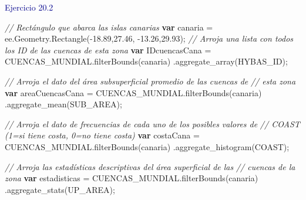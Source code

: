 \documentclass[
  12pt,
  letterpaper,
  twoside]{book}
\newenvironment{Shaded}{\begin{snugshade}}{\end{snugshade}}
\newcommand{\AttributeTok}[1]{\textcolor[rgb]{0.48,0.12,0.64}{#1}}
\newcommand{\CommentTok}[1]{\textcolor[rgb]{0.24,0.58,0.00}{\textit{#1}}}
\newcommand{\ControlFlowTok}[1]{\textcolor[rgb]{0.00,0.00,0.00}{\textbf{#1}}}
\newcommand{\FloatTok}[1]{\textcolor[rgb]{0.28,0.53,0.93}{#1}}
\newcommand{\FunctionTok}[1]{\textcolor[rgb]{0.48,0.12,0.64}{#1}}
\newcommand{\KeywordTok}[1]{\textcolor[rgb]{0.48,0.12,0.64}{#1}}
\newcommand{\NormalTok}[1]{#1}
\newcommand{\OperatorTok}[1]{\textcolor[rgb]{0.00,0.00,0.00}{#1}}
\newcommand{\StringTok}[1]{\textcolor[rgb]{0.87,0.29,0.22}{#1}}
\begin{document}
\textcolor{darkblue}{Ejercicio 20.2}

\begin{Shaded}
\begin{Highlighting}[]
\CommentTok{// Rectángulo que abarca las islas canarias}
\ControlFlowTok{var}\NormalTok{ canaria }\OperatorTok{=} \KeywordTok{ee}\OperatorTok{.}\AttributeTok{Geometry}\OperatorTok{.}\FunctionTok{Rectangle}\NormalTok{(}\OperatorTok{{-}}\FloatTok{18.89}\OperatorTok{,}\FloatTok{27.46}\OperatorTok{,} \OperatorTok{{-}}\FloatTok{13.26}\OperatorTok{,}\FloatTok{29.93}\NormalTok{)}\OperatorTok{;} 
\CommentTok{// Arroja una lista con todos los ID de las cuencas de esta zona}
\ControlFlowTok{var}\NormalTok{ IDcuencasCana }\OperatorTok{=}\NormalTok{ CUENCAS\_MUNDIAL}\OperatorTok{.}\FunctionTok{filterBounds}\NormalTok{(canaria)}
\OperatorTok{.}\FunctionTok{aggregate\_array}\NormalTok{(}\StringTok{\textquotesingle{}HYBAS\_ID\textquotesingle{}}\NormalTok{)}\OperatorTok{;}

\CommentTok{// Arroja el dato del área subsuperficial promedio de las cuencas de }
\CommentTok{// esta zona}
\ControlFlowTok{var}\NormalTok{ areaCuencasCana }\OperatorTok{=}\NormalTok{ CUENCAS\_MUNDIAL}\OperatorTok{.}\FunctionTok{filterBounds}\NormalTok{(canaria)}
\OperatorTok{.}\FunctionTok{aggregate\_mean}\NormalTok{(}\StringTok{\textquotesingle{}SUB\_AREA\textquotesingle{}}\NormalTok{)}\OperatorTok{;}

\CommentTok{// Arroja el dato de frecuencias de cada uno de los posibles valores de}
\CommentTok{// COAST (1=si tiene costa, 0=no tiene costa)}
\ControlFlowTok{var}\NormalTok{ costaCana }\OperatorTok{=}\NormalTok{ CUENCAS\_MUNDIAL}\OperatorTok{.}\FunctionTok{filterBounds}\NormalTok{(canaria)}
\OperatorTok{.}\FunctionTok{aggregate\_histogram}\NormalTok{(}\StringTok{\textquotesingle{}COAST\textquotesingle{}}\NormalTok{)}\OperatorTok{;} 

\CommentTok{// Arroja las estadísticas descriptivas del área superficial de las}
\CommentTok{// cuencas de la zona}
\ControlFlowTok{var}\NormalTok{ estadisticas }\OperatorTok{=}\NormalTok{ CUENCAS\_MUNDIAL}\OperatorTok{.}\FunctionTok{filterBounds}\NormalTok{(canaria)}
\OperatorTok{.}\FunctionTok{aggregate\_stats}\NormalTok{(}\StringTok{\textquotesingle{}UP\_AREA\textquotesingle{}}\NormalTok{)}\OperatorTok{;} 
\end{Highlighting}
\end{Shaded}
\end{document}
